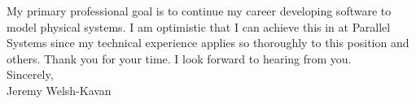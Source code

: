 \documentclass[]{letter}
\begin{document}
My primary professional goal is to continue my career developing software to model physical systems. I am optimistic that I can achieve this in at Parallel Systems since my technical experience applies so thoroughly to this position and others. Thank you for your time. I look forward to hearing from you. \\

Sincerely, \\
Jeremy Welsh-Kavan
\end{document}
